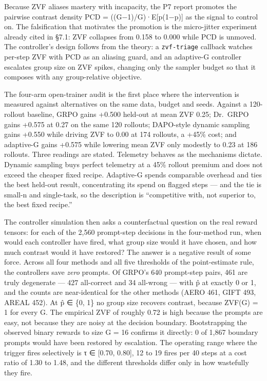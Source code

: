 \documentclass[12pt,a4paper]{report}
\begin{document}
Because ZVF aliases mastery with incapacity, the P7 report promotes the
pairwise contrast density PCD = ((G−1)/G)·E{[}p(1−p){]} as the signal to
control on. The falsification that motivates the promotion is the
micro-jitter experiment already cited in §7.1: ZVF collapses from 0.158
to 0.000 while PCD is unmoved. The controller's design follows from the
theory: a \texttt{zvf-triage} callback watches per-step ZVF with PCD as
an aliasing guard, and an adaptive-G controller escalates group size on
ZVF spikes, changing only the sampler budget so that it composes with
any group-relative objective.

The four-arm open-trainer audit is the first place where the
intervention is measured against alternatives on the same data, budget
and seeds. Against a 120-rollout baseline, GRPO gains +0.500 held-out at
mean ZVF 0.25; Dr.~GRPO gains +0.575 at 0.27 on the same 120 rollouts;
DAPO-style dynamic sampling gains +0.550 while driving ZVF to 0.00 at
174 rollouts, a +45\% cost; and adaptive-G gains +0.575 while lowering
mean ZVF only modestly to 0.23 at 186 rollouts. Three readings are
stated. Telemetry behaves as the mechanisms dictate. Dynamic sampling
buys perfect telemetry at a 45\% rollout premium and does not exceed the
cheaper fixed recipe. Adaptive-G spends comparable overhead and ties the
best held-out result, concentrating its spend on flagged steps --- and
the tie is small-n and single-task, so the description is ``competitive
with, not superior to, the best fixed recipe.''

The controller simulation then asks a counterfactual question on the
real reward tensors: for each of the 2,560 prompt-step decisions in the
four-method run, when would each controller have fired, what group size
would it have chosen, and how much contrast would it have restored? The
answer is a negative result of some force. Across all four methods and
all five thresholds of the point-estimate rule, the controllers save
\emph{zero} prompts. Of GRPO's 640 prompt-step pairs, 461 are truly
degenerate --- 427 all-correct and 34 all-wrong --- with p̂ at exactly 0
or 1, and the counts are near-identical for the other methods (AERO 461,
GIFT 493, AREAL 452). At p̂ ∈ \{0, 1\} no group size recovers contrast,
because ZVF(G) = 1 for every G. The empirical ZVF of roughly 0.72 is
high because the prompts are easy, not because they are noisy at the
decision boundary. Bootstrapping the observed binary rewards to size G =
16 confirms it directly: 0 of 1,867 boundary prompts would have been
restored by escalation. The operating range where the trigger fires
selectively is τ ∈ {[}0.70, 0.80{]}, 12 to 19 fires per 40 steps at a
cost ratio of 1.30 to 1.48, and the different thresholds differ only in
how wastefully they fire.
\end{document}
